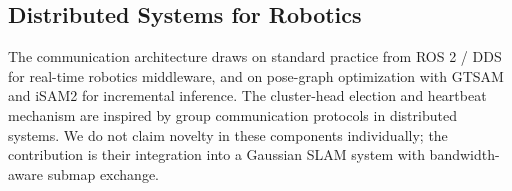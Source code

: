 \subsection{Distributed Systems for Robotics}
The communication architecture draws on standard practice from ROS 2 / DDS for
real-time robotics middleware, and on pose-graph optimization with GTSAM
\cite{gtsam} and iSAM2 for incremental inference. The cluster-head election
and heartbeat mechanism are inspired by group communication protocols in
distributed systems. We do not claim novelty in these components individually;
the contribution is their integration into a Gaussian SLAM system with
bandwidth-aware submap exchange.

